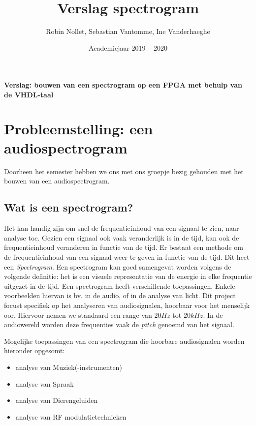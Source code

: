 \documentclass[a4paper,kul]{kulakarticle} %
\date{Academiejaar 2019 -- 2020}
\title{Verslag spectrogram}
\author{Robin Nollet, Sebastian Vantomme, Ine Vanderhaeghe}
\begin{document}
	
\maketitle
	
\begin{center}
	\centering
	\vspace*{\fill}
	\huge
	\textbf{Verslag: bouwen van een spectrogram op een FPGA met behulp van de VHDL-taal}
	\vspace*{\fill}
\end{center}
	
\newpage
	
\tableofcontents

\newpage

\section{Probleemstelling: een audiospectrogram}

Doorheen het semester hebben we ons met ons groepje bezig gehouden met het bouwen van een audiospectrogram.

\subsection{Wat is een spectrogram?}

Het kan handig zijn om snel de frequentieinhoud van een signaal te zien, naar analyse toe. Gezien een signaal ook vaak veranderlijk is in de tijd, kan ook de frequentieinhoud veranderen in functie van de tijd. Er bestaat een methode om de frequentieinhoud van een signaal weer te geven in functie van de tijd. Dit heet een \textit{Spectrogram}. Een spectrogram kan goed samengevat worden volgens de volgende definitie: het is een visuele representatie van de energie in elke frequentie uitgezet in de tijd. Een spectrogram heeft verschillende toepassingen. Enkele voorbeelden hiervan is bv. in de audio, of in de analyse van licht. Dit project focust specifiek op het analyseren van audiosignalen, hoorbaar voor het menselijk oor. Hiervoor nemen we standaard een range van $20Hz$ tot $20kHz$. In de audiowereld worden deze frequenties vaak de \textit{pitch} genoemd van het signaal. 


Mogelijke toepassingen van een spectrogram die hoorbare audiosignalen worden hieronder opgesomt:
\begin{itemize}
	\item analyse van Muziek(-instrumenten)
	\item analyse van Spraak
	\item analyse van Dierengeluiden
	\item analyse van RF modulatietechnieken
\end{itemize}
\end{document}
